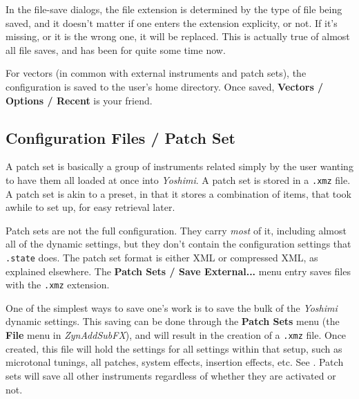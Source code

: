    In the file-save dialogs, the file extension is determined by the type of
   file being saved, and it doesn't matter if one enters the extension
   explicity, or not. If it's missing, or it is the wrong one, it will be
   replaced. This is actually true of almost all file saves, and has been for
   quite some time now.

   For vectors (in common with external instruments and patch sets),
   the configuration is saved to the user's home directory.
   Once saved, \textbf{Vectors / Options / Recent} is your friend.


\subsection{Configuration Files / Patch Set}
\label{subsec:configuration_patch_set}

   A patch set is basically a group of instruments related simply by the user
   wanting to have them all loaded at once into \textsl{Yoshimi}.  A patch set
   is stored in a \texttt{.xmz} file.  A patch set is akin to a preset, in that
   it stores a combination of items, that took awhile to set up, for easy
   retrieval later.

   Patch sets are not the full configuration. They carry \textsl{most} of it,
   including almost all of the dynamic settings, but they don't contain the
   configuration settings that \texttt{.state} does.  The patch set format is
   either XML or compressed XML, as explained elsewhere.  The
   \textbf{Patch Sets / Save External...} menu entry saves files with
   the \texttt{.xmz} extension.

   One of the simplest ways to save one's work is to save the bulk of the
\textsl{Yoshimi} dynamic settings.
   This saving can be done through the \textbf{Patch Sets} menu
   (the \textbf{File} menu in \textsl{ZynAddSubFX}),
   and will result in the creation of
   a \texttt{.xmz} file. Once created, this file will hold the settings for
   all settings within that setup, such as microtonal tunings, all
   patches, system effects, insertion effects, etc.
   See .
   Patch sets will save all other instruments regardless of whether they are
   activated or not.

